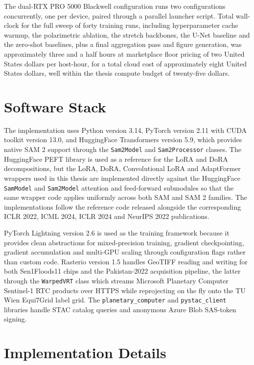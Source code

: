 \documentclass[11pt,a4paper,oneside]{report}
\begin{document}
The dual-RTX PRO 5000 Blackwell configuration runs two configurations concurrently, one per device, paired through a parallel launcher script. Total wall-clock for the full sweep of forty training runs, including hyperparameter cache warmup, the polarimetric ablation, the stretch backbones, the U-Net baseline and the zero-shot baselines, plus a final aggregation pass and figure generation, was approximately three and a half hours at marketplace floor pricing of two United States dollars per host-hour, for a total cloud cost of approximately eight United States dollars, well within the thesis compute budget of twenty-five dollars.

\section{Software Stack}

The implementation uses Python version 3.14, PyTorch version 2.11 with CUDA toolkit version 13.0, and HuggingFace Transformers version 5.9, which provides native SAM 2 support through the \texttt{Sam2Model} and \texttt{Sam2Processor} classes. The HuggingFace PEFT library is used as a reference for the LoRA and DoRA decompositions, but the LoRA, DoRA, Convolutional LoRA and AdaptFormer wrappers used in this thesis are implemented directly against the HuggingFace \texttt{SamModel} and \texttt{Sam2Model} attention and feed-forward submodules so that the same wrapper code applies uniformly across both SAM and SAM 2 families. The implementations follow the reference code released alongside the corresponding ICLR 2022, ICML 2024, ICLR 2024 and NeurIPS 2022 publications.

PyTorch Lightning version 2.6 is used as the training framework because it provides clean abstractions for mixed-precision training, gradient checkpointing, gradient accumulation and multi-GPU scaling through configuration flags rather than custom code. Rasterio version 1.5 handles GeoTIFF reading and writing for both Sen1Floods11 chips and the Pakistan-2022 acquisition pipeline, the latter through the \texttt{WarpedVRT} class which streams Microsoft Planetary Computer Sentinel-1 RTC products over HTTPS while reprojecting on the fly onto the TU Wien Equi7Grid label grid. The \texttt{planetary\_computer} and \texttt{pystac\_client} libraries handle STAC catalog queries and anonymous Azure Blob SAS-token signing.

\section{Implementation Details}
\end{document}
